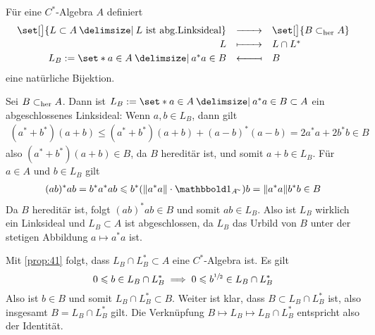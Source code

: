 \begin{satz}[label=satz:49,{name=[Bijektion abgeschlossene Linksideale und hereditäre C*-Algebren]}]
	Für eine $C^*$-Algebra $A$ definiert
	\[
		\begin{array}{rcl}
			\set[\big]{L \subset A \given L \text{ ist abg.Linksideal} } &\xrightarrow{\minwidthbox{ }{2em}} & \set[\big]{B \subher A} \\[0.5ex]
			\textstyle L &\xmapsto{\minwidthbox{\mbox{ }}{2em}} & \textstyle L \cap L^* \\[0.5ex]
			\textstyle L_B :=\set*{a \in A \given a^*a \in B} &\reflectbox{\ensuremath{\xmapsto{\minwidthbox{\mbox{ }}{2em}}}} & \textstyle B 
		\end{array}
	\]
	eine natürliche Bijektion.
\end{satz}
\begin{beweis}
	Sei $B \subset_{\operatorname{her}} A$. Dann ist $L_B := \set*{a \in A \given a^*a \in B} \subset A$ ein abgeschlossenes Linksideal: Wenn $a,b \in L_B$, dann gilt
	\begin{align}
		(a^*+b^*)(a+b) \le (a^*+b^*)(a+b)+ (a-b)^*(a-b) = 2a^*a + 2b^*b \in B
	\end{align}
	also $(a^*+b^*)(a+b) \in B$, da $B$ hereditär ist, und somit $a+b \in L_B$. 
	Für $a \in A$ und $b \in L_B$ gilt
	\begin{align}
		(ab)^* ab = b^*a^* ab \le b^* \enbrace*{\norm*{a^*a}\cdot \ind_{A^\simm}} b = \norm*{a^*a} b^*b \in B
	\end{align}
	Da $B$ hereditär ist, folgt $(ab)^*ab \in B$ und somit $ab \in L_B$. 
	Also ist $L_B$ wirklich ein Linksideal und $L_B \subset A$ ist abgeschlossen, da $L_B$ das Urbild von $B$ unter der stetigen Abbildung $a \mapsto a^*a$ ist.
	
	Mit \autoref{prop:41} folgt, dass $L_B \cap L_B^* \subset A$ eine $C^*$-Algebra ist. Es gilt
	\[
		0 \leqslant b \in L_B \cap L_B^* \implies 0 \leqslant b^{\sfrac{1}{2}} \in L_B \cap L_B^*
	\]  
	Also ist $b \in B$ und somit $L_B \cap L_B^* \subset B$. 
	Weiter ist klar, dass $B \subset L_B \cap L_B^*$ ist, also insgesamt $B=L_B \cap L_B^*$ gilt. 
	Die Verknüpfung $B \mapsto L_B \mapsto L_B \cap L_B^* $ entspricht also der Identität.
	

\end{beweis}
